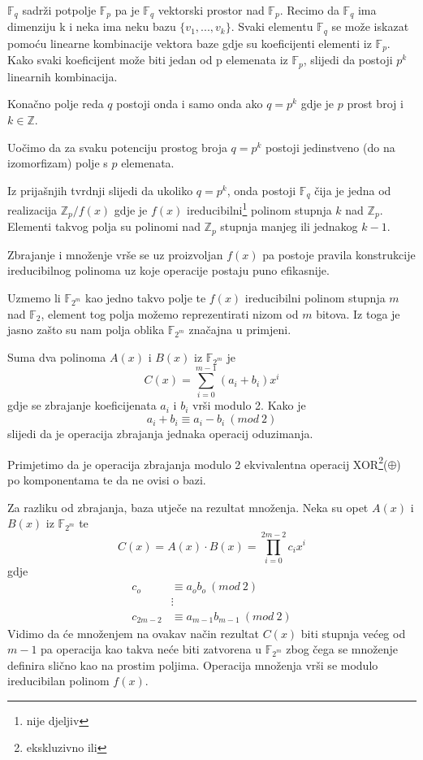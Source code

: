 \documentclass{mathos}
\begin{document}
$\mathbb{F}_q$ sadrži potpolje $\mathbb{F}_p$ pa je $\mathbb{F}_q$ vektorski prostor nad $\mathbb{F}_p$. Recimo da $\mathbb{F}_q$ ima dimenziju k i neka ima neku bazu $\{v_1, ..., v_k\}$. Svaki elementu $\mathbb{F}_q$ se može iskazat pomoću linearne kombinacije vektora baze gdje su koeficijenti elementi iz $\mathbb{F}_p$. Kako svaki koeficijent može biti jedan od p elemenata iz $\mathbb{F}_p$, slijedi da postoji $p^k$ linearnih kombinacija.
\begin{korolar}
    Konačno polje reda $q$ postoji onda i samo onda ako $q = p^k$ gdje je $p$ prost broj i $k \in \mathbb{Z}$.
\end{korolar}
\begin{nap}
    Uočimo da za svaku potenciju prostog broja $q = p^k$ postoji jedinstveno (do na izomorfizam) polje s $p$ elemenata.
\end{nap}

Iz prijašnjih tvrdnji slijedi da ukoliko $q = p^k$, onda postoji $\mathbb{F}_q$ čija je jedna od realizacija $\mathbb{Z}_p/f(x)$ gdje je $f(x)$ ireducibilni\footnote{nije djeljiv} polinom stupnja $k$ nad $\mathbb{Z}_p$. Elementi takvog polja su polinomi nad $\mathbb{Z}_p$ stupnja manjeg ili jednakog $k-1$.

\begin{nap}
    Zbrajanje i množenje vrše se uz proizvoljan $f(x)$ pa postoje pravila konstrukcije ireducibilnog polinoma uz koje operacije postaju puno efikasnije. 
\end{nap}

Uzmemo li $\mathbb{F}_{2^m}$ kao jedno takvo polje te $f(x)$ ireducibilni polinom stupnja $m$ nad $\mathbb{F}_2$, element tog polja možemo reprezentirati nizom od $m$ bitova. Iz toga je jasno zašto su nam polja oblika $\mathbb{F}_{2^m}$ značajna u primjeni.

Suma dva polinoma $A(x)$ i $B(x)$ iz $\mathbb{F}_{2^m}$ je
\[ C(x) = \sum_{i = 0}^{m - 1} (a_i + b_i) x^i \]
gdje se zbrajanje koeficijenata $a_i$ i $b_i$ vrši modulo 2. Kako je
\[ a_i + b_i \equiv a_i - b_i \ (mod\ 2) \]
slijedi da je operacija zbrajanja jednaka operacij oduzimanja.
\begin{nap}
    Primjetimo da je operacija zbrajanja modulo 2 ekvivalentna operacij XOR\footnote{ekskluzivno ili}($\oplus$) po komponentama te da ne ovisi o bazi.
\end{nap}

Za razliku od zbrajanja, baza utječe na rezultat množenja. Neka su opet $A(x)$ i $B(x)$ iz $\mathbb{F}_{2^m}$ te
\[ C(x) = A(x) \cdot B(x) = \prod_{i = 0}^{2m - 2} c_i x^i \]
gdje
\[
\begin{split}
    c_o & \equiv a_o b_o \ (mod \ 2) \\
    & \vdots \\
    c_{2m - 2} & \equiv a_{m-1} b_{m-1} \ (mod \ 2)
\end{split}
\]
Vidimo da će množenjem na ovakav način rezultat $C(x)$ biti stupnja većeg od $m-1$ pa operacija kao takva neće biti zatvorena u $\mathbb{F}_{2^m}$ zbog čega se množenje definira slično kao na prostim poljima. Operacija množenja vrši se modulo ireducibilan polinom $f(x)$.
\end{document}
